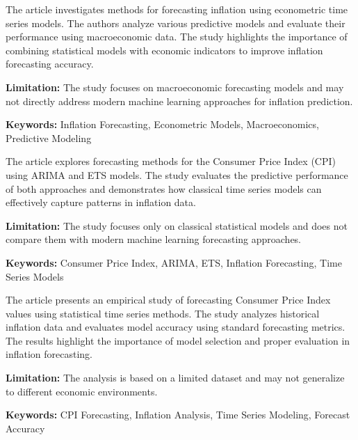 
{
	The article \cite{StockWatson1999} investigates methods for forecasting inflation using econometric time series models. The authors analyze various predictive models and evaluate their performance using macroeconomic data. The study highlights the importance of combining statistical models with economic indicators to improve inflation forecasting accuracy.
	
	\bigskip
	
	\textbf{Limitation:} The study focuses on macroeconomic forecasting models and may not directly address modern machine learning approaches for inflation prediction.
	
	\scriptsize{\textbf{Keywords:} Inflation Forecasting, Econometric Models, Macroeconomics, Predictive Modeling}
}


{
	The article \cite{Hu2025} explores forecasting methods for the Consumer Price Index (CPI) using ARIMA and ETS models. The study evaluates the predictive performance of both approaches and demonstrates how classical time series models can effectively capture patterns in inflation data.
	
	\bigskip
	
	\textbf{Limitation:} The study focuses only on classical statistical models and does not compare them with modern machine learning forecasting approaches.
	
	\scriptsize{\textbf{Keywords:} Consumer Price Index, ARIMA, ETS, Inflation Forecasting, Time Series Models}
}


{
	The article \cite{Mchukwa2025} presents an empirical study of forecasting Consumer Price Index values using statistical time series methods. The study analyzes historical inflation data and evaluates model accuracy using standard forecasting metrics. The results highlight the importance of model selection and proper evaluation in inflation forecasting.
	
	\bigskip
	
	\textbf{Limitation:} The analysis is based on a limited dataset and may not generalize to different economic environments.
	
	\scriptsize{\textbf{Keywords:} CPI Forecasting, Inflation Analysis, Time Series Modeling, Forecast Accuracy}
}

